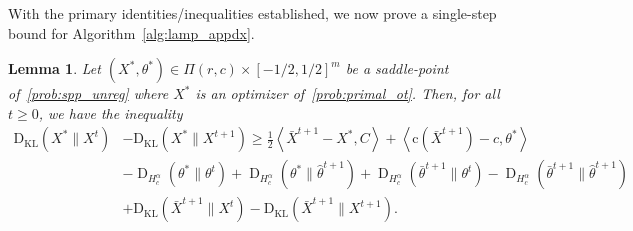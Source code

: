 \documentclass[10pt]{article}
\newcommand{\DHa}{\D_{H_c^\alpha}}
\newcommand{\inner}[2]{\left\langle #1,#2\right\rangle}
\newcommand{\coup}{\Pi}
\newcommand{\D}{\operatorname{D}}
\theoremstyle{plain}
\newtheorem{lemma}[theorem]{Lemma}
\theoremstyle{definition}
\theoremstyle{remark}
\newcommand{\KL}{\mathrm{D}_\mathrm{KL}}
\newcommand{\col}{\bm{\mathrm{c}}}
\begin{document}
With the primary identities/inequalities established, we now prove a single-step bound for Algorithm~\ref{alg:lamp_appdx}.
\begin{lemma}\label{lem:single_step}
 Let $(X^*,\theta^*)\in\coup(r,c)\times[-1/2,1/2]^m$ be a saddle-point of~\eqref{prob:spp_unreg} where $X^*$ is an optimizer of~\eqref{prob:primal_ot}. Then, for all $t\geq 0$, we have the inequality
    \begin{align}
        \nonumber\KL(X^*\|X^t)&-\KL(X^*\|X^{t+1})\geq\frac{1}{2}\inner{\bar X^{t+1}-X^*}{C}+\inner{\col(\bar X^{t+1})-c}{\theta^*}\\
        \nonumber&-\DHa(\theta^*\|\theta^{t})+\DHa(\theta^*\|\hat\theta^{t+1})+\DHa(\bar\theta^{t+1}\|\theta^{t})-\DHa(\bar\theta^{t+1}\|\hat\theta^{t+1}) \\
        &+ \KL(\bar X^{t+1}\|X^t)-\KL(\bar X^{t+1}\|X^{t+1}).\label{ineq:single_step}
        \end{align}
\end{lemma}
\end{document}
